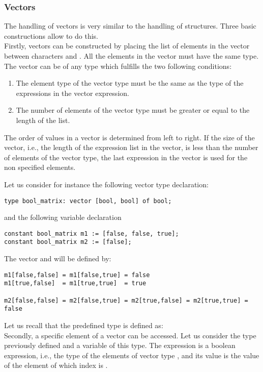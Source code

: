 \structuredef



\subsubsection{Vectors}
The handling of vectors is very similar to the handling of structures.
Three basic constructions allow to do this.\\

 Firstly,
vectors can be constructed by placing the list of elements in the
vector between characters \LS{[} and \LS{]}.  All the elements in the
vector must have the same type.  The vector can be of any type which
fulfills the two following conditions:
\begin{enumerate}
\item
  The element type of the vector type must be the same as the type of
  the expressions in the vector expression.
\item
  The number of elements of the vector type must be greater or equal
  to the length of the list.
\end{enumerate}
The order of values in a vector is determined from left to right.  If
the size of the vector, i.e., the length of the expression list in the
vector, is less than the number of elements of the vector type, the
last expression in the vector is used for the non specified elements.

Let us consider for instance the following vector type declaration:
\begin{lstlisting}
type bool_matrix: vector [bool, bool] of bool;
\end{lstlisting}
and the following variable declaration
\begin{lstlisting}
constant bool_matrix m1 := [false, false, true];
constant bool_matrix m2 := [false];
\end{lstlisting}
The vector  and  will be defined by:
\begin{lstlisting}
m1[false,false] = m1[false,true] = false
m1[true,false]  = m1[true,true]  = true

m2[false,false] = m2[false,true] = m2[true,false] = m2[true,true] = false
\end{lstlisting}
Let us recall that the predefined type  is defined as:
\\

 Secondly, a
specific element of a vector can be accessed.  Let us consider the
type  previously defined and  a variable of this
type.  The expression  is a boolean expression,
i.e., the type of the elements of vector type , and
its value is the value of the element of  which index is
.\\

